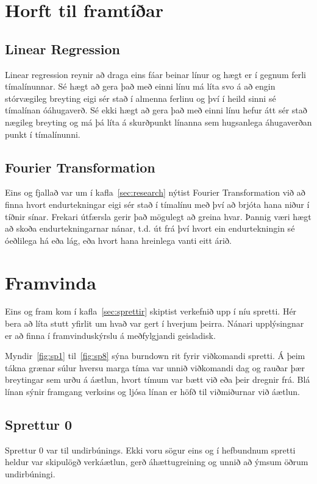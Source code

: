 \documentclass{article}
\begin{document}
\section{Horft til framtíðar}
\label{sec:future}

\subsection{Linear Regression}
\label{sec:future_linear}
Linear regression reynir að draga eins fáar beinar línur og hægt er í gegnum ferli tímalínunnar.
Sé hægt að gera það með einni línu má líta svo á að engin stórvægileg breyting 
eigi sér stað í almenna ferlinu og því í heild sinni sé tímalínan óáhugaverð. 
Sé ekki hægt að gera það með einni línu hefur átt sér stað nægileg breyting og má þá líta á skurðpunkt línanna sem
hugsanlega áhugaverðan punkt í tímalínunni.

\subsection{Fourier Transformation}
\label{sec:future_fourier}
Eins og fjallað var um í kafla~\ref{sec:research} nýtist Fourier
Transformation við að finna hvort endurtekningar eigi sér stað í tímalínu með því að brjóta 
hana niður í tíðnir sínar. Frekari útfærsla gerir það mögulegt að greina hvar.
Þannig væri hægt að skoða endurtekningarnar nánar,
t.d. út frá því hvort ein endurtekningin sé óeðlilega há eða lág, eða hvort hana
hreinlega vanti eitt árið.

\newpage
\section{Framvinda}
Eins og fram kom í kafla~\ref{sec:sprettir} skiptist verkefnið upp í níu spretti. 
Hér bera að líta stutt yfirlit um hvað var gert í hverjum þeirra. Nánari upplýsingnar 
er að finna í framvinduskýrslu á meðfylgjandi geisladisk.

Myndir~\ref{fig:sp1} til~\ref{fig:sp8} sýna burndown rit fyrir viðkomandi spretti. 
Á þeim tákna grænar súlur hversu marga tíma var 
unnið viðkomandi dag og rauðar þær breytingar sem urðu á áætlun, hvort tímum var bætt við eða 
þeir dregnir frá. Blá línan sýnir framgang verksins og ljósa línan er höfð til viðmiðurnar 
við áætlun.

\subsection{Sprettur 0}
Sprettur 0 var til undirbúnings. Ekki voru sögur eins og í
hefbundnum spretti heldur var skipulögð verkáætlun, gerð áhættugreining og unnið að ýmsum öðrum
undirbúningi.
\newpage
\end{document}
